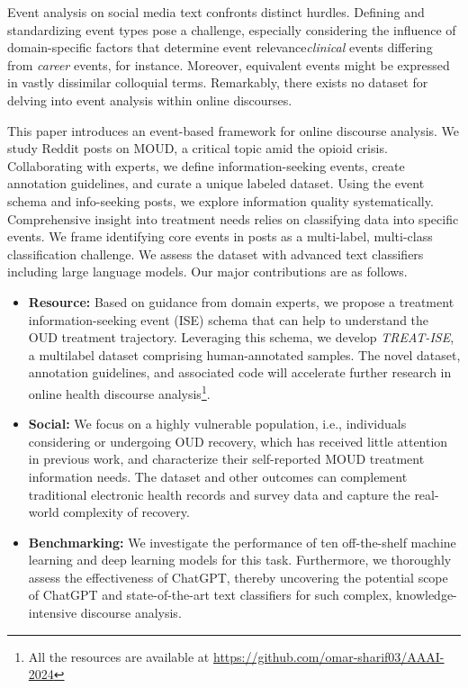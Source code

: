 \documentclass[letterpaper]{article}
\begin{document}
Event analysis on social media text confronts distinct hurdles. Defining and standardizing event types pose a challenge, especially considering the influence of domain-specific factors that determine event relevance\textit{clinical} events differing from \textit{career} events, for instance. Moreover, equivalent events might be expressed in vastly dissimilar colloquial terms. Remarkably, there exists no dataset for delving into event analysis within online discourses.


This paper introduces an event-based framework for online discourse analysis. We study Reddit posts on MOUD, a critical topic amid the opioid crisis. Collaborating with experts, we define information-seeking events, create annotation guidelines, and curate a unique labeled dataset. Using the event schema and info-seeking posts, we explore information quality systematically. Comprehensive insight into treatment needs relies on classifying data into specific events. We frame identifying core events in posts as a multi-label, multi-class classification challenge. We assess the dataset with advanced text classifiers including large language models.
Our major contributions are as follows.
\begin{itemize}

\item \textbf{Resource:} Based on guidance from domain experts, we propose a treatment information-seeking event (ISE) schema that can help to understand the OUD treatment trajectory. Leveraging this schema, we develop \textit{TREAT-ISE}, a multilabel dataset comprising human-annotated samples. The novel dataset, annotation guidelines, and associated code will accelerate further research in online health discourse analysis\footnote{All the resources are available at \url{https://github.com/omar-sharif03/AAAI-2024}}.

\item \textbf{Social:} We focus on a highly vulnerable population, i.e., individuals considering or undergoing OUD recovery, which has received little attention in previous work, and characterize their self-reported MOUD treatment information needs. The dataset and other outcomes can complement traditional electronic health records and survey data and capture the real-world complexity of recovery.
\item \textbf{Benchmarking:} We investigate the performance of ten off-the-shelf machine learning and deep learning models for this task. Furthermore, we thoroughly assess the effectiveness of ChatGPT, thereby uncovering the potential scope of ChatGPT and state-of-the-art text classifiers for such complex, knowledge-intensive discourse analysis.
\end{itemize}
\end{document}
